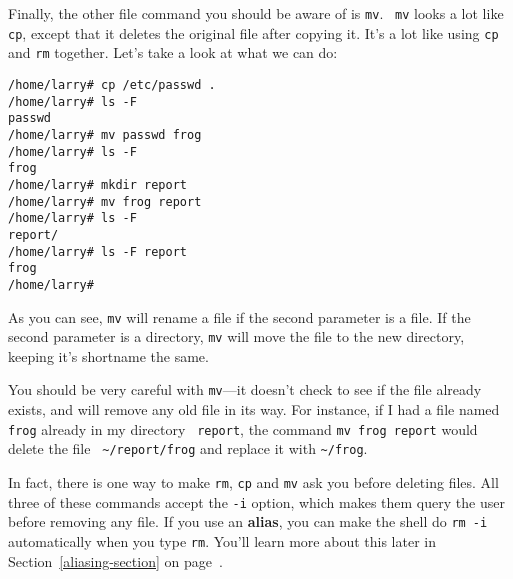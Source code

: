 Finally, the other file command you should be aware of is {\tt mv}. {\tt
mv} looks a lot like {\tt cp}, except that it deletes the original file
after copying it.  It's a lot like using {\tt cp} and {\tt rm}
together. Let's take a look at what we can do:

\begin{screen}\begin{verbatim}
/home/larry# cp /etc/passwd .
/home/larry# ls -F
passwd
/home/larry# mv passwd frog
/home/larry# ls -F
frog
/home/larry# mkdir report
/home/larry# mv frog report
/home/larry# ls -F
report/
/home/larry# ls -F report
frog
/home/larry#
\end{verbatim}\end{screen}

As you can see, {\tt mv} will rename a file if the second parameter is a
file. If the second parameter is a directory, {\tt mv} will move the file
to the new directory, keeping it's shortname the same.

\cautionpar You should be very careful with {\tt mv}---it doesn't check 
to see if the file already exists, and will remove any old file in its way.
For instance, if I had a file named {\tt frog} already in my directory {\tt
report}, the command {\tt mv frog report} would delete the file {\tt
\verb+~+/report/frog} and replace it with {\tt \verb+~+/frog}.

In fact, there is one way to make {\tt rm}, {\tt cp} and {\tt mv} ask
you before deleting files.  All three of these commands accept the
{\tt -i} option, which makes them query the user before removing any
file. If you use an {\bf alias}, you can make the shell do {\tt rm -i}
automatically when you type {\tt rm}.  You'll learn more about this
later in Section~\ref{aliasing-section} on
page~\pageref{aliasing-section}.


